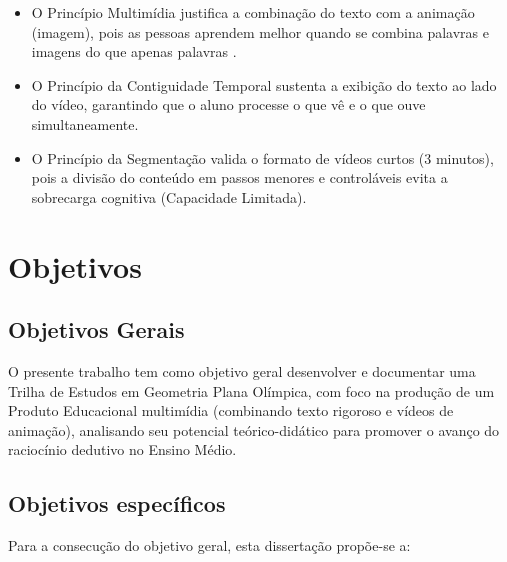 \begin{itemize}
    \item O Princípio Multimídia justifica a combinação do texto com a animação (imagem), pois as pessoas aprendem melhor quando se combina palavras e imagens do que apenas palavras \cite{mayer2021multimedia}.
    \item O Princípio da Contiguidade Temporal sustenta a exibição do texto ao lado do vídeo, garantindo que o aluno processe o que vê e o que ouve simultaneamente.

    \item O Princípio da Segmentação valida o formato de vídeos curtos (3 minutos), pois a divisão do conteúdo em passos menores e controláveis evita a sobrecarga cognitiva (Capacidade Limitada).
\end{itemize}





\section{Objetivos}
\subsection{Objetivos Gerais}
O presente trabalho tem como objetivo geral desenvolver e documentar uma Trilha de Estudos em Geometria Plana Olímpica, com foco na produção de um Produto Educacional multimídia (combinando texto rigoroso e vídeos de animação), analisando seu potencial teórico-didático para promover o avanço do raciocínio dedutivo no Ensino Médio.
\subsection{Objetivos específicos}

Para a consecução do objetivo geral, esta dissertação propõe-se a:

